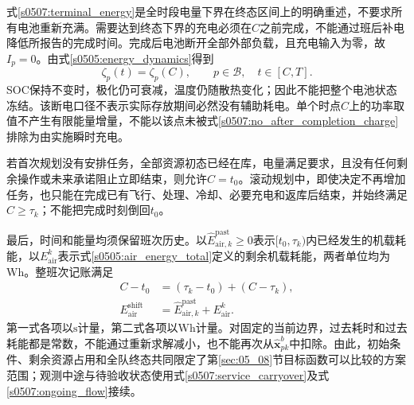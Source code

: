式\eqref{s0507:terminal_energy}是全时段电量下界在终态区间上的明确重述，不要求所有电池重新充满。需要达到终态下界的充电必须在$C$之前完成，不能通过班后补电降低所报告的完成时间。完成后电池断开全部外部负载，且充电输入为零，故$I_p=0$。由式\eqref{s0505:energy_dynamics}得到
\begin{equation}
 \zeta_p(t)=\zeta_p(C),\qquad
 p\in\mathcal B,\quad t\in[C,T].
 \label{s0507:constant_terminal_energy}
\end{equation}
SOC保持不变时，极化仍可衰减，温度仍随散热变化；因此不能把整个电池状态冻结。该断电口径不表示实际存放期间必然没有辅助耗电。单个时点$C$上的功率取值不产生有限能量增量，不能以该点未被式\eqref{s0507:no_after_completion_charge}排除为由实施瞬时充电。

若首次规划没有安排任务，全部资源初态已经在库，电量满足要求，且没有任何剩余操作或未来承诺阻止立即结束，则允许$C=t_0$。滚动规划中，即使决定不再增加任务，也只能在完成已有飞行、处理、冷却、必要充电和返库后结束，并始终满足$C\ge\tau_k$；不能把完成时刻倒回$t_0$。

最后，时间和能量均须保留班次历史。以$\widehat E_{\mathrm{air},k}^{\mathrm{past}}\ge0$表示$[t_0,\tau_k)$内已经发生的机载耗能，以$E_{\mathrm{air}}^k$表示式\eqref{s0505:air_energy_total}定义的剩余机载耗能，两者单位均为$\mathrm{Wh}$。整班次记账满足
\begin{align}
 C-t_0&=(\tau_k-t_0)+(C-\tau_k),
 \label{s0507:elapsed_time_account}\\
 E_{\mathrm{air}}^{\mathrm{shift}}
 &=\widehat E_{\mathrm{air},k}^{\mathrm{past}}+E_{\mathrm{air}}^k.
 \label{s0507:shift_energy_account}
\end{align}
第一式各项以$\mathrm s$计量，第二式各项以$\mathrm{Wh}$计量。对固定的当前边界，过去耗时和过去耗能都是常数，不能通过重新求解减小，也不能再次从$\widehat{\mathbf x}_{pk}^b$中扣除。由此，初始条件、剩余资源占用和全队终态共同限定了第\ref{sec:05_08}节目标函数可以比较的方案范围；观测中途与待验收状态使用式\eqref{s0507:service_carryover}及式\eqref{s0507:ongoing_flow}接续。
